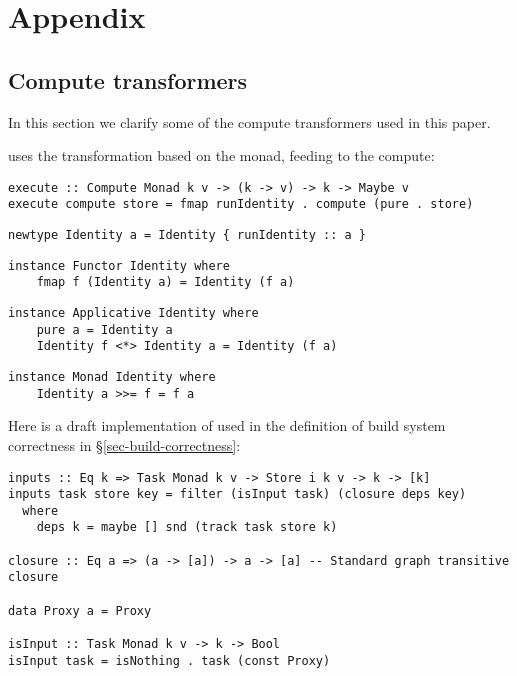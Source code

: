 \clearpage
\section{Appendix}\label{sec-appendix}

\subsection{Compute transformers}\label{sec-appendix-transformers}

In this section we clarify some of the compute transformers used in this paper.

 uses the transformation based on the  monad, feeding
 to the compute:

\begin{verbatim}
execute :: Compute Monad k v -> (k -> v) -> k -> Maybe v
execute compute store = fmap runIdentity . compute (pure . store)
\end{verbatim}
\vspace{1mm}
\begin{verbatim}
newtype Identity a = Identity { runIdentity :: a }
\end{verbatim}
\vspace{1mm}
\begin{verbatim}
instance Functor Identity where
    fmap f (Identity a) = Identity (f a)
\end{verbatim}
\vspace{1mm}
\begin{verbatim}
instance Applicative Identity where
    pure a = Identity a
    Identity f <*> Identity a = Identity (f a)
\end{verbatim}
\vspace{1mm}
\begin{verbatim}
instance Monad Identity where
    Identity a >>= f = f a
\end{verbatim}
\vspace{1mm}




Here is a draft implementation of  used in the definition of
build system correctness in \S\ref{sec-build-correctness}:

\begin{verbatim}
inputs :: Eq k => Task Monad k v -> Store i k v -> k -> [k]
inputs task store key = filter (isInput task) (closure deps key)
  where
    deps k = maybe [] snd (track task store k)

closure :: Eq a => (a -> [a]) -> a -> [a] -- Standard graph transitive closure

data Proxy a = Proxy

isInput :: Task Monad k v -> k -> Bool
isInput task = isNothing . task (const Proxy)
\end{verbatim}

